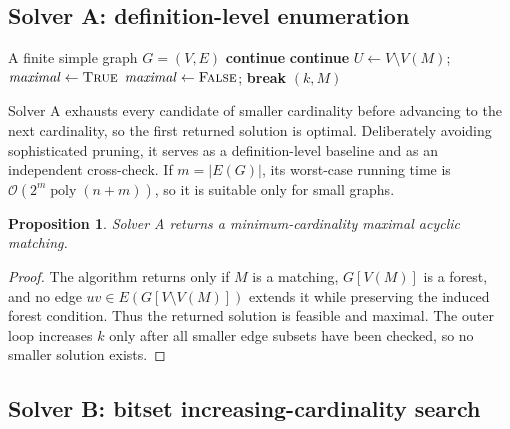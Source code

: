 \documentclass[smallextended,natbib,nospthms]{svjour3}
\newtheorem{proposition}[proposition]{Proposition}
\theoremstyle{definition}
\theoremstyle{remark}
\newcommand{\bigO}{\mathcal{O}}
\begin{document}
\subsection{Solver A: definition-level enumeration}

\begin{algorithm}[t]
\caption{Solver A: definition-level exact enumeration}
\label{alg:solver-a}
\begin{algorithmic}[1]
\Require A finite simple graph $G=(V,E)$
      \State \textbf{continue}
    \EndIf
      \State \textbf{continue}
    \EndIf
    \State $U\gets V\setminus V(M)$; \quad $\mathit{maximal}\gets\textsc{True}$
        \State $\mathit{maximal}\gets\textsc{False}$; \quad \textbf{break}
      \EndIf
    \EndFor
      \State \Return $(k,M)$
    \EndIf
  \EndFor
\EndFor
\end{algorithmic}
\end{algorithm}

Solver A exhausts every candidate of smaller cardinality before advancing to
the next cardinality, so the first returned solution is optimal. Deliberately
avoiding sophisticated pruning, it serves as a definition-level baseline and
as an independent cross-check. If $m=|E(G)|$, its worst-case running time is
$\bigO(2^m\operatorname{poly}(n+m))$, so it is suitable only for small graphs.

\begin{proposition}
\label{prop:solver-a}
Solver A returns a minimum-cardinality maximal acyclic matching.
\end{proposition}

\begin{proof}
The algorithm returns only if $M$ is a matching, $G[V(M)]$ is a forest, and no
edge $uv\in E(G[V\setminus V(M)])$ extends it while preserving the induced
forest condition. Thus the returned solution is feasible and maximal. The
outer loop increases $k$ only after all smaller edge subsets have been checked,
so no smaller solution exists.
\end{proof}

\subsection{Solver B: bitset increasing-cardinality search}
\end{document}
